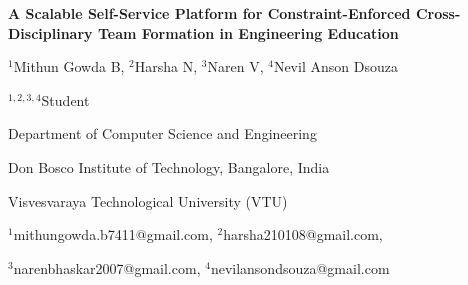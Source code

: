 \documentclass[12pt,a4paper]{article}
\begin{document}
\begin{center}
{\LARGE\bfseries A Scalable Self-Service Platform for Constraint-Enforced Cross-Disciplinary Team Formation in Engineering Education}

\vspace{12pt}

{\large $^1$Mithun Gowda B, $^2$Harsha N, $^3$Naren V, $^4$Nevil Anson Dsouza}

\vspace{4pt}

$^{1,2,3,4}$Student

Department of Computer Science and Engineering

Don Bosco Institute of Technology, Bangalore, India

Visvesvaraya Technological University (VTU)

\vspace{4pt}

$^1$mithungowda.b7411@gmail.com, $^2$harsha210108@gmail.com,

$^3$narenbhaskar2007@gmail.com, $^4$nevilansondsouza@gmail.com
\end{center}

\vspace{8pt}
\end{document}
